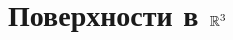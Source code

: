 \documentclass[../main.tex]{subfiles}
\begin{document}
 \chapter{Поверхности в $\mathbb{R}^3$}
 
\end{document}
